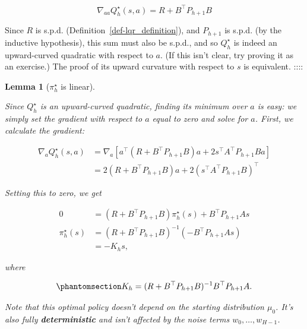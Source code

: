 \documentclass[
  letterpaper,
  DIV=11,
  numbers=noendperiod]{scrreprt}
\theoremstyle{plain}
\newtheorem{lemma}{Lemma}[chapter]
\theoremstyle{plain}
\theoremstyle{definition}
\theoremstyle{definition}
\theoremstyle{remark}
\begin{document}
\[
\nabla_{aa} Q_h^\star(s, a) = R + B^\top P_{h+1} B
\]

Since \(R\) is s.p.d. (Definition~\ref{def-lqr_definition}), and
\(P_{h+1}\) is s.p.d. (by the inductive hypothesis), this sum must also
be s.p.d., and so \(Q^\star_h\) is indeed an upward-curved quadratic
with respect to \(a\). (If this isn't clear, try proving it as an
exercise.) The proof of its upward curvature with respect to \(s\) is
equivalent. ::::

\begin{lemma}[\(\pi^\star_h\) is
linear]\protect\hypertarget{lem-pi_linear}{}\label{lem-pi_linear}

Since \(Q^\star_h\) is an upward-curved quadratic, finding its minimum
over \(a\) is easy: we simply set the gradient with respect to \(a\)
equal to zero and solve for \(a\). First, we calculate the gradient:

\[
\begin{aligned}
    \nabla_aQ^\star_h(s, a) & = \nabla_a[ a^\top (R + B^\top P_{h+1} B) a+ 2 s^\top A^\top P_{h+1} B a] \\
                                       & = 2 (R + B^\top P_{h+1} B) a+ 2 (s^\top A^\top P_{h+1} B)^\top
\end{aligned}
\]

Setting this to zero, we get

\[
\begin{aligned}
    0                  & = (R + B^\top P_{h+1} B) \pi^\star_h(s) + B^\top P_{h+1} A s\nonumber \\
    \pi^\star_h(s) & = (R + B^\top P_{h+1} B)^{-1} (-B^\top P_{h+1} A s) \nonumber              \\
                       & = - K_hs,
\end{aligned}
\]

where

\begin{equation}\phantomsection\label{eq-k_pi}{
K_h= (R + B^\top P_{h+1} B)^{-1} B^\top P_{h+1} A.
}\end{equation}

Note that this optimal policy doesn't depend on the starting
distribution \(\mu_0\). It's also fully \textbf{deterministic} and isn't
affected by the noise terms \(w_0, \dots, w_{H-1}\).

\end{lemma}
\end{document}

